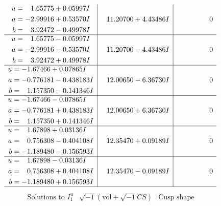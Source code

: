 \documentclass[1p]{elsarticle_modified}
\theoremstyle{definition}
\newcommand{\I}{\sqrt{-1}}
\begin{document}
$$\begin{array}{c|c|c}
\begin{aligned}
u &= \phantom{-}1.65775 + 0.05997 I \\
a &= -2.99916 + 0.53570 I \\
b &= \phantom{-}3.92472 - 0.49978 I\end{aligned}
 & \phantom{-}11.20700 + 4.43486 I & \phantom{-0.000000 } 0 \\ \hline\begin{aligned}
u &= \phantom{-}1.65775 - 0.05997 I \\
a &= -2.99916 - 0.53570 I \\
b &= \phantom{-}3.92472 + 0.49978 I\end{aligned}
 & \phantom{-}11.20700 - 4.43486 I & \phantom{-0.000000 } 0 \\ \hline\begin{aligned}
u &= -1.67466 + 0.07865 I \\
a &= -0.776181 - 0.438183 I \\
b &= \phantom{-}1.157350 - 0.141346 I\end{aligned}
 & \phantom{-}12.00650 - 6.36730 I & \phantom{-0.000000 } 0 \\ \hline\begin{aligned}
u &= -1.67466 - 0.07865 I \\
a &= -0.776181 + 0.438183 I \\
b &= \phantom{-}1.157350 + 0.141346 I\end{aligned}
 & \phantom{-}12.00650 + 6.36730 I & \phantom{-0.000000 } 0 \\ \hline\begin{aligned}
u &= \phantom{-}1.67898 + 0.03136 I \\
a &= \phantom{-}0.756308 - 0.404108 I \\
b &= -1.189480 - 0.156593 I\end{aligned}
 & \phantom{-}12.35470 + 0.09189 I & \phantom{-0.000000 } 0 \\ \hline\begin{aligned}
u &= \phantom{-}1.67898 - 0.03136 I \\
a &= \phantom{-}0.756308 + 0.404108 I \\
b &= -1.189480 + 0.156593 I\end{aligned}
 & \phantom{-}12.35470 - 0.09189 I & \phantom{-0.000000 } 0\\
 \hline 
 \end{array}$$\newpage$$\begin{array}{c|c|c}  
\text{Solutions to }I^u_{1}& \I (\text{vol} + \sqrt{-1}CS) & \text{Cusp shape}\\

\end{array}$$
\end{document}

